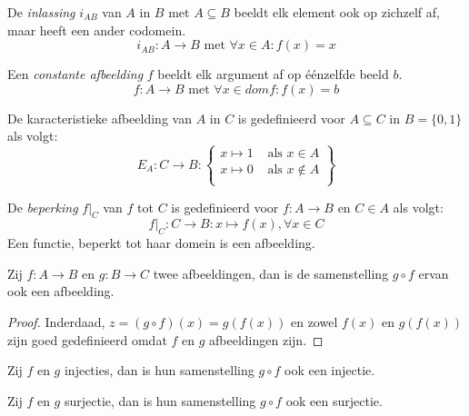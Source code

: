 \documentclass[main.tex]{subfiles}
\begin{document}
\begin{de}
  De \emph{inlassing} $i_{AB}$ van $A$ in $B$ met $A \subseteq B$ beeldt elk element ook op zichzelf af, maar heeft een ander codomein.
  \[ i_{AB}: A \rightarrow B \text{ met } \forall x \in A: f(x) = x \]
\end{de}

\begin{de}
  Een \emph{constante afbeelding} $f$ beeldt elk argument af op \'e\'enzelfde beeld $b$.
  \[ f: A \rightarrow B \text{ met } \forall x \in dom f: f(x) = b \]
\end{de}

\begin{de}
  De karacteristieke afbeelding van $A$ in $C$ is gedefinieerd voor $A \subseteq C$ in $B = \{0,1\}$ als volgt:
  \[
  E_{A}: C \rightarrow B:
  \left \lbrace
    \begin{array}{cc}
      x \mapsto 1 &\text{ als } x \in A\\
      x \mapsto 0 &\text{ als } x \not\in A\\
    \end{array}
  \right \rbrace
  \]
\end{de}

\begin{de}
  De \emph{beperking} $f|_{C}$ van $f$ tot $C$ is gedefinieerd voor $f: A \rightarrow B$ en $C \in A$ als volgt:
  \[ f|_{C}: C \rightarrow B: x \mapsto f(x), \forall x \in C\]
  Een functie, beperkt tot haar domein is een afbeelding.
\end{de}

\begin{st}
  Zij $f: A \rightarrow B$ en $g: B \rightarrow C$ twee afbeeldingen, dan is de samenstelling $g \circ f$ ervan ook een afbeelding.

  \begin{proof}
    Inderdaad, $z = (g \circ f)(x) = g(f(x))$ en zowel $f(x)$ en $g(f(x))$ zijn goed gedefinieerd omdat $f$ en $g$ afbeeldingen zijn. 
  \end{proof}
\end{st}

\begin{st}
  Zij $f$ en $g$ injecties, dan is hun samenstelling $g \circ f$ ook een injectie.
\end{st}

\begin{st}
  Zij $f$ en $g$ surjectie, dan is hun samenstelling $g \circ f$ ook een surjectie.
\end{st}
\end{document}
